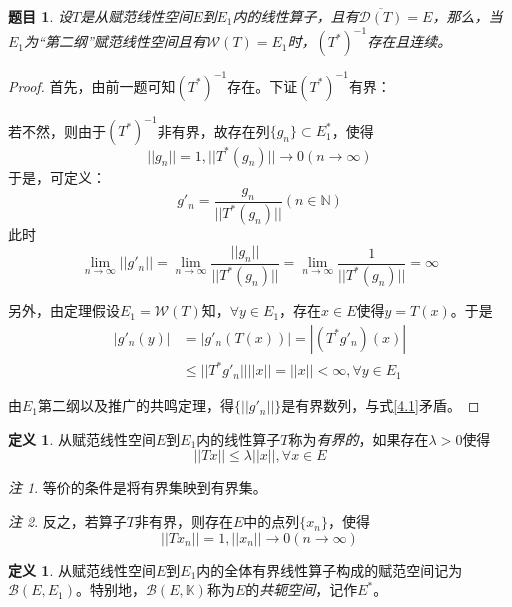\documentclass[winfonts,UTF8,c5size,a4paper,fancyhdr,hyperref,titlepage,nocap]{ctexart}
\theoremstyle{question}
\newtheorem{Qut}{题目}
\theoremstyle{theorem}
\theoremstyle{definition}
\newtheorem{defn}[thm]{定义}
\theoremstyle{remark}
\newtheorem*{rem}{注}
\numberwithin{equation}{subsection}
\newcommand{\N}{\mathbb{N}}
\newcommand{\K}{\mathbb{K}}
\newcommand{\red}{\color{red}}
\begin{document}
\begin{Qut}
设$T$是从赋范线性空间$E$到$E_1$内的线性算子，且有$\overline{\mathcal{D}(T)}=E$，那么，当$E_1$为``第二纲''赋范线性空间且有$\mathcal{W}(T)=E_1$时，$(T^{\ast})^{-1}$存在且连续。
\end{Qut}
\begin{proof}
  首先，由前一题可知$(T^{\ast})^{-1}$存在。下证$(T^{\ast})^{-1}$有界：

若不然，则由于$(T^{\ast})^{-1}$非有界，故存在列$\{g_n\}\subset E_1^{\ast}$，使得
\begin{equation*}
||g_n||=1,||T^{\ast}(g_n)||\to 0(n\to\infty)
\end{equation*}
于是，可定义：
\begin{equation*}
g'_n=\frac{g_n}{||T^{\ast}(g_n)||}(n\in\N)
\end{equation*}
此时
\begin{equation}\label{4.1}
\lim_{n\to\infty}||g'_n||=\lim_{n\to\infty}\frac{||g_n||}{||T^{\ast}(g_n)||}=\lim_{n\to\infty}\frac{1}{||T^{\ast}(g_n)||}=\infty
\end{equation}

另外，由定理假设$E_1=\mathcal{W}(T)$知，$\forall y\in E_1$，存在$x\in E$使得$y=T(x)$。于是
\begin{align*}
|g'_n(y)|&=|g'_n(T(x))|=|(T^{\ast}g'_n)(x)|\\
         &\leqslant||T^{\ast}g'_n||||x||=||x||<\infty, \forall y\in E_1
\end{align*}

由$E_1$第二纲以及推广的共鸣定理，得$\{||g'_n||\}$是有界数列，与式\ref{4.1}矛盾。
\end{proof}

\begin{defn}
  从赋范线性空间$E$到$E_1$内的线性算子$T$称为\emph{\red 有界的}，如果存在$\lambda>0$使得
  \begin{equation*}
  ||Tx||\leqslant\lambda||x||, \forall x\in E
  \end{equation*}
\end{defn}
\begin{rem}
  等价的条件是将有界集映到有界集。
\end{rem}
\begin{rem}
  反之，若算子$T$非有界，则存在$E$中的点列$\{x_n\}$，使得
  \begin{equation*}
    ||Tx_n||=1,||x_n||\to 0(n\to\infty)
  \end{equation*}
\end{rem}

\begin{defn}
  从赋范线性空间$E$到$E_1$内的全体有界线性算子构成的赋范空间记为$\mathcal{B}(E,E_1)$。特别地，$\mathcal{B}(E,\K)$称为$E$的\emph{\red 共轭空间}，记作$E^{\ast}$。
\end{defn}
\end{document}
